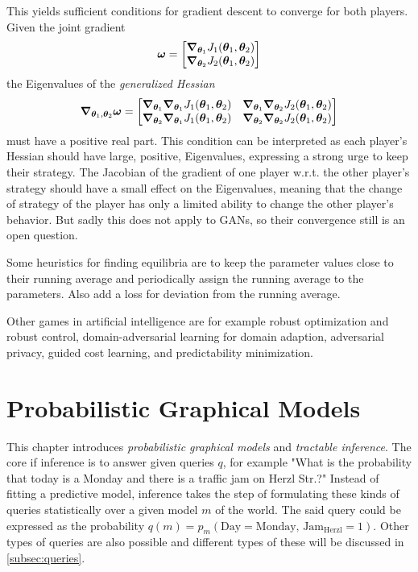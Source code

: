 		This yields sufficient conditions for gradient descent to converge for both players. Given the joint gradient
		\begin{equation}
			\bm{\omega} =
				\begin{bmatrix}
					\grad_{\bm{\theta}_1} J_1(\bm{\theta}_1, \bm{\theta}_2) \\
					\grad_{\bm{\theta}_2} J_2(\bm{\theta}_1, \bm{\theta}_2)
				\end{bmatrix}
		\end{equation}
		the Eigenvalues of the \emph{generalized Hessian}
		\begin{equation}
			\grad_{\bm{\theta}_1, \bm{\theta}_2} \bm{\omega} =
				\begin{bmatrix}
					\grad_{\bm{\theta}_1} \grad_{\bm{\theta}_1} J_1(\bm{\theta}_1, \bm{\theta}_2) & \grad_{\bm{\theta}_1} \grad_{\bm{\theta}_2} J_2(\bm{\theta}_1, \bm{\theta}_2) \\
					\grad_{\bm{\theta}_2} \grad_{\bm{\theta}_1} J_1(\bm{\theta}_1, \bm{\theta}_2) & \grad_{\bm{\theta}_2} \grad_{\bm{\theta}_2} J_2(\bm{\theta}_1, \bm{\theta}_2)
				\end{bmatrix}
		\end{equation}
		must have a positive real part. This condition can be interpreted as each player's Hessian should have large, positive, Eigenvalues, expressing a strong urge to keep their strategy. The Jacobian of the gradient of one player w.r.t. the other player's strategy should have a small effect on the Eigenvalues, meaning that the change of strategy of the player has only a limited ability to change the other player's behavior. But sadly this does not apply to GANs, so their convergence still is an open question.

		Some heuristics for finding equilibria are to keep the parameter values close to their running average and periodically assign the running average to the parameters. Also add a loss for deviation from the running average.

		Other games in artificial intelligence are for example robust optimization and robust control, domain-adversarial learning for domain adaption, adversarial privacy, guided cost learning, and predictability minimization.

\chapter{Probabilistic Graphical Models}
	This chapter introduces \emph{probabilistic graphical models} and \emph{tractable inference}. The core if inference is to answer given queries \(q\), for example "What is the probability that today is a Monday and there is a traffic jam on Herzl Str.?" Instead of fitting a predictive model, inference takes the step of formulating these kinds of queries statistically over a given model \(m\) of the world. The said query could be expressed as the probability \( q(m) = p_{m}(\text{Day} = \text{Monday},\, \text{Jam}_\text{Herzl} = 1) \). Other types of queries are also possible and different types of these will be discussed in \autoref{subsec:queries}.

